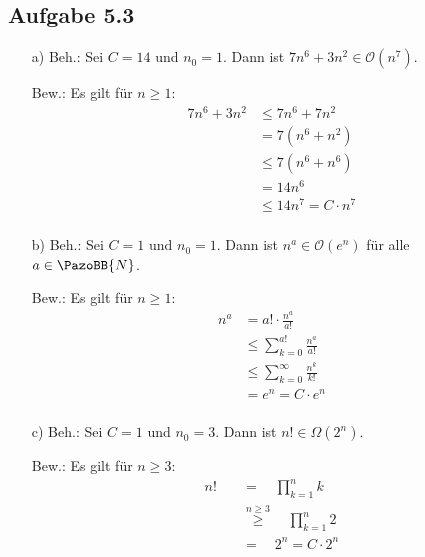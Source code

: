 \documentclass[12pt]{article}
\newcommand {\N}{\PazoBB{N}}   %
\newcommand {\Om}{\mathcal{O}} %
\begin{document}
\subsection*{Aufgabe 5.3}
\begin{enumerate}
\item[a) Beh.:] Sei $C = 14$ und $n_0 = 1$. Dann ist $7n^6 + 3n^2 \in \Om(n^7)$.
\item[Bew.:]  Es gilt für $n\geq 1$:
   \begin{align*}
                                                       7n^6 + 3n^2          & \leq 7n^6 + 7n^2      \\
                                                                                       & =    7 ( n^6 + n^2)    \\
                                                                                       & \leq 7 ( n^6 + n^6)    \\
                                                                                       & = 14 n^6                     \\
                                                                                       & \leq 14 n^7    = C \cdot n^7                 \\
   \end{align*}
\item[b) Beh.:] Sei $C = 1$ und $n_0 = 1$. Dann ist $n^a \in \Om(e^n)$ für alle $a\in \N$.
\item[Bew.:]  Es gilt für $n\geq 1$:
   \begin{align*}
                                                       n^a                         & = a!\cdot\frac {n^{a}}{a!}       \\
                                                                                       & \leq \sum^{a!}_{k=0} \frac {n^{a}}{a!}      \\
                                                                                       & \leq \sum^{\infty}_{k=0} \frac {n^{k}}{k!}      \\
                                                                                       & = e^n   = C\cdot e^n                                                         \\
   \end{align*}
\item[c) Beh.:] Sei $C = 1$ und $n_0 = 3$. Dann ist $n!\in \Omega(2^n)$.
\item[Bew.:]  Es gilt für $n\geq 3$:
   \begin{align*}
                                                      n!                    \quad         & =                                        \quad \prod^n_{k=1} k    \\
                                                                                       & \stackrel{n \geq 3}{\geq} \quad  \prod^n_{k=1} 2   \\
                                                                                       & =                                        \quad 2^n  = C\cdot 2^n\\
   \end{align*}


\end{enumerate}
\end{document}
